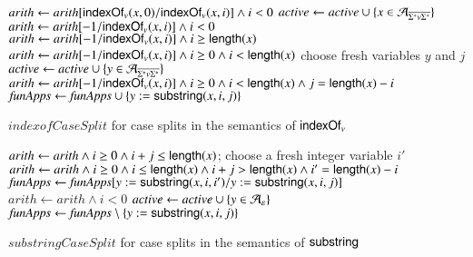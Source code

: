 \begin{algorithm}[htbp]
  \small
  
		{
			$arith \leftarrow arith[\mathsf{indexOf}_v(x, 0)/\mathsf{indexOf}_v(x,i)] \wedge i < 0$\;
		}
		{
			$active \leftarrow active \cup \{x \in \mathcal{A}_{\overline{\Sigma^* v \Sigma^*}}\}$\;
			$arith \leftarrow arith[-1/\mathsf{indexOf}_v(x,i)] \wedge i < 0$\;
		}
		{
			$arith \leftarrow arith[-1/\mathsf{indexOf}_v(x,i)] \wedge i \ge \mathsf{length}(x)$\;
		}
		{
			$arith \leftarrow arith[-1/\mathsf{indexOf}_v(x,i)] \wedge i \ge 0 \wedge i < \mathsf{length}(x)$\;
		}
		{
			choose fresh variables $y$ and $j$\;
			$active \leftarrow active \cup \{y \in \mathcal{A}_{\overline{\Sigma^* v \Sigma^*}}\}$\;
			$arith \leftarrow arith[-1/\mathsf{indexOf}_v(x,i)] \wedge i \ge 0 \wedge i < \mathsf{length}(x) \wedge j = \mathsf{length}(x)-i$\;
			 $\mathit{funApps} \leftarrow \mathit{funApps} \cup \{y:=\mathsf{substring}(x, i, j)\}$\;
		}		
\caption{$\mathit{indexofCaseSplit}$ for case splits in the semantics of $\mathsf{indexOf}_v$}\label{alg:indexof}
\end{algorithm}

\begin{algorithm}[htbp]
  \small

		{
			 $arith \leftarrow arith \wedge i \ge 0 \wedge i+j \le \mathsf{length}(x)$;
		}
		{
			 choose a fresh integer variable $i'$\;
			 $arith \leftarrow arith \wedge i \ge 0 \wedge i \le \mathsf{length}(x) \wedge i+j > \mathsf{length}(x) \wedge i' = \mathsf{length}(x)-i$\;
			 $\mathit{funApps} \leftarrow \mathit{funApps}[y:=\mathsf{substring}(x, i, i')/y:=\mathsf{substring}(x, i, j)]$\;
		}
		{
			 $arith \leftarrow arith \wedge i < 0$\;
			 $active \leftarrow active \cup \{y \in \mathcal{A}_\varepsilon\}$\;
			 $\mathit{funApps} \leftarrow \mathit{funApps} \setminus \{y:=\mathsf{substring}(x, i, j)\}$\;		 
		}
\caption{$\mathit{substringCaseSplit}$  for case splits in the semantics of $\mathsf{substring}$}\label{alg:substring}
\end{algorithm}





